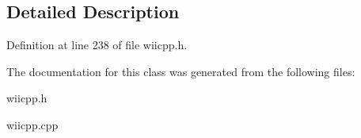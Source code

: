 \subsection{\-Detailed \-Description}


\-Definition at line 238 of file wiicpp.\-h.



\-The documentation for this class was generated from the following files\-:\begin{DoxyCompactItemize}
\item 
wiicpp.\-h\item 
wiicpp.\-cpp\end{DoxyCompactItemize}
